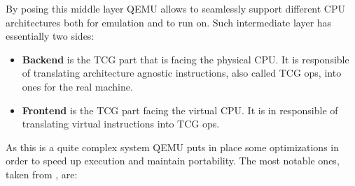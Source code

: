 By posing this middle layer QEMU allows to seamlessly support different CPU architectures both for emulation and to run on. Such intermediate layer has essentially two sides:

\begin{itemize}
    \item \textbf{Backend} is the TCG part that is facing the physical CPU. It is responsible of translating architecture agnostic instructions, also called TCG ops, into ones for the real machine.
    \item \textbf{Frontend} is the TCG part facing the virtual CPU. It is in responsible of translating virtual instructions into TCG ops.
\end{itemize} 

As this is a quite complex system QEMU puts in place some optimizations in order to speed up execution and maintain portability. The most notable ones, taken from \cite{translatorinternals}, are:

